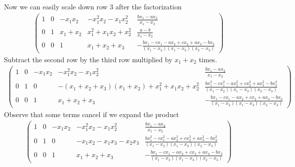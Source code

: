 Now we can easily scale down row 3 after the factorization
\begin{eqnarray*}
\left(\begin{array}{rrrr|r}
1 & 0 & -x_{1} x_{2} & -x_{1}^{2} x_{2} - x_{1} x_{2}^{2} & \frac{b x_{1} - a x_{2}}{x_{1} - x_{2}} \\
0 & 1 & x_{1} + x_{2} & x_{1}^{2} + x_{1} x_{2} + x_{2}^{2} & \frac{a - b}{x_{1} - x_{2}} \\
0 & 0 & 1 & x_{1} + x_{2} + x_{3} & -\frac{b x_{1} - c x_{1} - a x_{2} + c x_{2} + a x_{3} - b x_{3}}{{\left(x_{1} - x_{2}\right)} {\left(x_{1} - x_{3}\right)} {\left(x_{2} - x_{3}\right)}}
\end{array}\right)
\end{eqnarray*}
Subtract the second row by the third row multiplied by $ x_1 + x_2 $ times.
\begin{eqnarray*}
\left(\begin{array}{rrrr|r}
1 & 0 & -x_{1} x_{2} & -x_{1}^{2} x_{2} - x_{1} x_{2}^{2} & \frac{b x_{1} - a x_{2}}{x_{1} - x_{2}} \\
0 & 1 & 0 & -{\left(x_{1} + x_{2} + x_{3}\right)} {\left(x_{1} + x_{2}\right)} + x_{1}^{2} + x_{1} x_{2} + x_{2}^{2} & \frac{b x_{1}^{2} - c x_{1}^{2} - a x_{2}^{2} + c x_{2}^{2} + a x_{3}^{2} - b x_{3}^{2}}{{\left(x_{1} - x_{2}\right)} {\left(x_{1} - x_{3}\right)} {\left(x_{2} - x_{3}\right)}} \\
0 & 0 & 1 & x_{1} + x_{2} + x_{3} & -\frac{b x_{1} - c x_{1} - a x_{2} + c x_{2} + a x_{3} - b x_{3}}{{\left(x_{1} - x_{2}\right)} {\left(x_{1} - x_{3}\right)} {\left(x_{2} - x_{3}\right)}}
\end{array}\right)
\end{eqnarray*}
Observe that some terms cancel if we expand the product
\begin{eqnarray*}
\left(\begin{array}{rrrr|r}
1 & 0 & -x_{1} x_{2} & -x_{1}^{2} x_{2} - x_{1} x_{2}^{2} & \frac{b x_{1} - a x_{2}}{x_{1} - x_{2}} \\
0 & 1 & 0 & -x_{1} x_{2} - x_{1} x_{3} - x_{2} x_{3} & \frac{b x_{1}^{2} - c x_{1}^{2} - a x_{2}^{2} + c x_{2}^{2} + a x_{3}^{2} - b x_{3}^{2}}{{\left(x_{1} - x_{2}\right)} {\left(x_{1} - x_{3}\right)} {\left(x_{2} - x_{3}\right)}} \\
0 & 0 & 1 & x_{1} + x_{2} + x_{3} & -\frac{b x_{1} - c x_{1} - a x_{2} + c x_{2} + a x_{3} - b x_{3}}{{\left(x_{1} - x_{2}\right)} {\left(x_{1} - x_{3}\right)} {\left(x_{2} - x_{3}\right)}}
\end{array}\right)
\end{eqnarray*}
